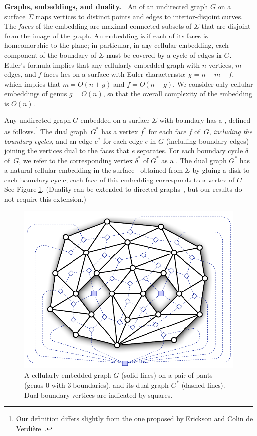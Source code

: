 \documentclass[twoside,leqno,twocolumn]{article}
\def\fakeparagraph#1{\par\medskip\noindent\textbf{#1}}
\begin{document}
\fakeparagraph{Graphs, embeddings, and duality.~}
An  of an undirected graph $G$ on a surface $\Sigma$ maps vertices to distinct points and edges to interior-disjoint curves.  The \emph{faces} of the embedding are maximal connected subsets of $\Sigma$ that are disjoint from the image of the graph.  An embedding is  if each of its faces is homeomorphic to the plane; in particular, in any cellular embedding, each component of the boundary of $\Sigma$ must be covered by a cycle of edges in $G$.  Euler's formula implies that any cellularly embedded graph with $n$ vertices, $m$ edges, and $f$ faces lies on a surface with Euler characteristic $\chi = n-m+f$, which implies that $m = O(n+g)$ and $f=O(n+g)$.  We consider only cellular embeddings of genus $g=O(n)$, so that the overall complexity of the embedding is $O(n)$.

Any undirected graph $G$ embedded on a surface $\Sigma$ with boundary has a , defined as follows.\footnote{Our definition differs slightly from the one proposed by Erickson and Colin de Verdi\`ere~\cite{octagons}.}  The dual graph~$G^*$ has a vertex $f^*$ for each face $f$ of~$G$, \emph{including the boundary cycles}, and an edge $e^*$ for each edge $e$ in $G$ (including boundary edges) joining the vertices dual to the faces that $e$ separates.  For each boundary cycle $\delta$ of~$G$, we refer to the corresponding vertex $\delta^*$ of $G^*$ as a .  The dual graph $G^*$ has a natural cellular embedding in the surface~\EMPH{$\Sigma^\bullet$} obtained from $\Sigma$ by gluing a disk to each boundary cycle; each face of this embedding corresponds to a vertex of $G$.  See Figure \ref{F:duality}.  (Duality can be extended to directed graphs~\cite{surflow}, but our results do not require this extension.)

\begin{figure}[htb]
\centering
\includegraphics[scale=0.45]{Fig/pants}
\caption{A cellularly embedded graph $G$ (solid lines) on a pair of pants (genus 0 with 3 boundaries), and its dual graph $G^*$ (dashed lines).  Dual boundary vertices are indicated by squares.}
\label{F:duality}
\end{figure}
\end{document}
